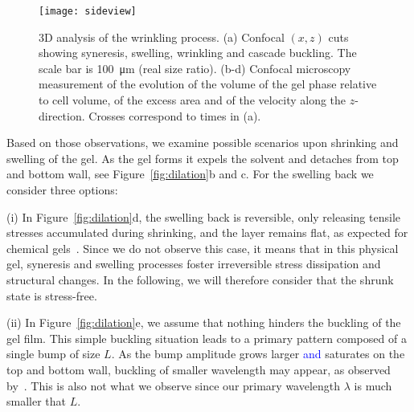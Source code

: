 \documentclass[twocolumn,superscriptaddress,showpacs,preprintnumbers, amsmath,amssymb,prl]{revtex4-1}
\begin{document}
\begin{figure}
	\texttt{[image: sideview]}
	\caption{3D analysis of the wrinkling process. (a) Confocal $(x,z)$ cuts showing syneresis, swelling, wrinkling and cascade buckling. The scale bar is \SI{100}{\micro\metre} (real size ratio). (b-d) Confocal microscopy measurement of the evolution of the volume of the gel phase relative to cell volume, of the excess area and of the velocity along the $z$-direction. Crosses correspond to times in (a).}
	\label{fig:sideview}
\end{figure}

Based on those observations, we examine possible scenarios upon shrinking and swelling of the gel. As the gel forms it expels the solvent and detaches from top and bottom wall, see Figure~\ref{fig:dilation}b and c. For the swelling back we consider three options: 

\noindent
(i) In Figure~\ref{fig:dilation}d, the swelling back is reversible, only releasing tensile stresses accumulated during shrinking, and the layer remains flat, as expected for chemical gels~\cite{Kim2010}. Since we do not observe this case, it means that in this physical gel, syneresis and swelling processes foster irreversible stress dissipation and structural changes. In the following, we will therefore consider that the shrunk state is stress-free. 

\noindent
(ii) In Figure~\ref{fig:dilation}e, we assume that nothing hinders the buckling of the gel film. This simple buckling situation leads to a primary pattern composed of a single bump of size $L$. As the bump amplitude grows larger \textcolor{blue}{and} saturates on the top and bottom wall, buckling of smaller wavelength may appear, as observed by~\cite{Roman1999}. This is also not what we observe since our primary wavelength $\lambda$ is much smaller that $L$.
\end{document}
